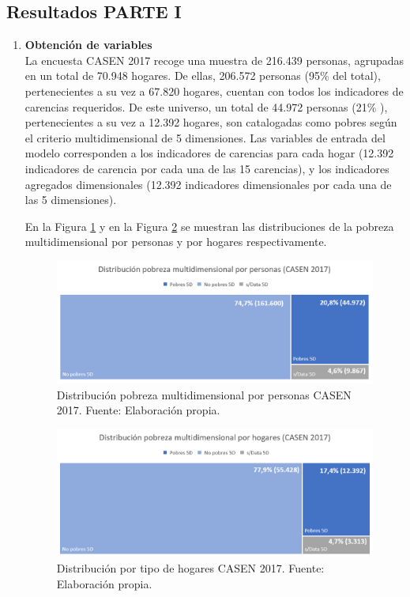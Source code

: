 \documentclass[12pt,letterpaper,spanish]{article}
\begin{document}
\subsection{Resultados PARTE I}
\begin{enumerate}
\item \textbf{Obtención de variables} \\
 La encuesta CASEN 2017 recoge una muestra de 216.439 personas, agrupadas en un total de 70.948 hogares. De ellas, 206.572 personas (95\% del total), pertenecientes a su vez a 67.820 hogares, cuentan con todos los indicadores de carencias requeridos. De este universo, un total de 44.972 personas (21\% ), pertenecientes a su vez a 12.392 hogares, son catalogadas como pobres según el criterio multidimensional de 5 dimensiones. Las variables de entrada del modelo corresponden a los indicadores de carencias para cada hogar (12.392 indicadores de carencia por cada una de las 15 carencias), y los indicadores agregados dimensionales (12.392 indicadores dimensionales por cada una de las 5 dimensiones).
 
 En la Figura \ref{pobresXpersona} y en la Figura \ref{pobresXhogar} se muestran las distribuciones de la pobreza multidimensional por personas y por hogares respectivamente.  

\begin{figure}[H]
    \centering
    \includegraphics[width=\textwidth]{Mati N/pobrezaXpersonas.png}
    \caption{Distribución pobreza multidimensional por personas CASEN 2017. Fuente: Elaboración propia.}
    \label{pobresXpersona}
\end{figure}

\begin{figure}[H]
    \centering
    \includegraphics[width=\textwidth]{Mati N/pobrezaXhogares.png}
    \caption{Distribución por tipo de hogares CASEN 2017. Fuente: Elaboración propia.}
    \label{pobresXhogar}
\end{figure}
 

\end{enumerate}
\end{document}
